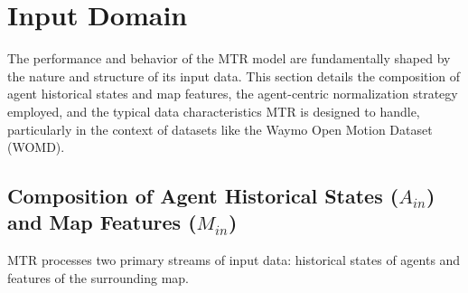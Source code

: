 \section{Input Domain}
\label{sec:input_domain}

The performance and behavior of the MTR model are fundamentally shaped by the nature and structure of its input data. This section details the composition of agent historical states and map features, the agent-centric normalization strategy employed, and the typical data characteristics MTR is designed to handle, particularly in the context of datasets like the Waymo Open Motion Dataset (WOMD).

\subsection{Composition of Agent Historical States ($A_{in}$) and Map Features ($M_{in}$)}
\label{subsec:composition_inputs}

MTR processes two primary streams of input data: historical states of agents and features of the surrounding map.

